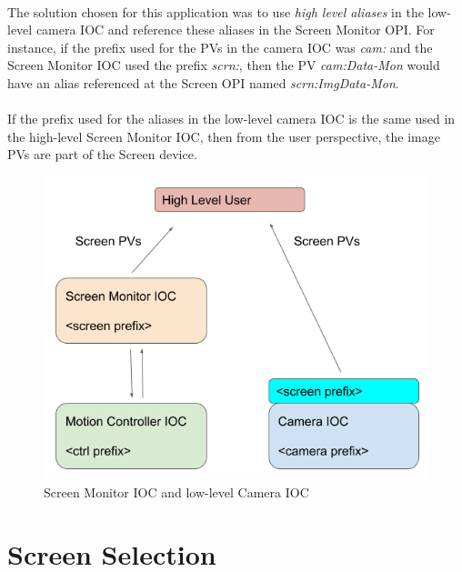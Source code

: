 \documentclass[openany]{article}
\begin{document}
    \paragraph{} The solution chosen for this application was to use \emph{high level aliases} in the low-level camera IOC and reference these aliases in the Screen Monitor OPI. For instance, if the prefix used for the PVs in the camera IOC was \emph{cam:} and the Screen Monitor IOC used the prefix \emph{scrn:}, then the PV \emph{cam:Data-Mon} would have an alias referenced at the Screen OPI named \emph{scrn:ImgData-Mon}.

    \paragraph{} If the prefix used for the aliases in the low-level camera IOC is the same used in the high-level Screen Monitor IOC, then from the user perspective, the image PVs are part of the Screen device.

    \begin{figure}[!h]
        \caption{Screen Monitor IOC and low-level Camera IOC}
        \label{fig:cam-integ}
        \centering
        \includegraphics[width=1.0\textwidth]{screen_ioc_cam_integration}
    \end{figure}
    \FloatBarrier

\section{Screen Selection}
\end{document}
